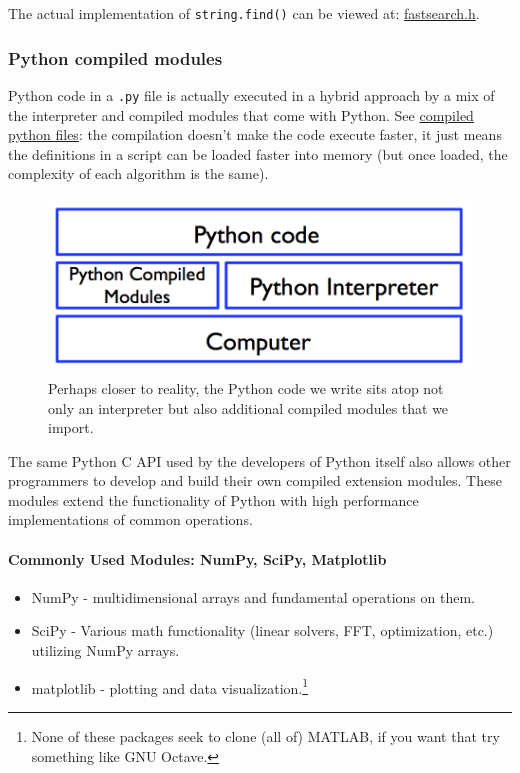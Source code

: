 \documentclass[12pt,letterpaper,twoside]{article}
\begin{document}
The actual implementation of \texttt{string.find()} can be viewed at:
\href{https://github.com/python/cpython/blob/master/Objects/stringlib/fastsearch.h}{fastsearch.h}.

\subsubsection{Python compiled modules}

Python code in a \texttt{.py} file is actually executed in a hybrid
approach by a mix of the interpreter and compiled modules that come
with Python. See
\href{https://docs.python.org/3/tutorial/modules.html#compiled-python-files}{compiled
  python files}: the compilation doesn't make the code execute faster,
it just means the definitions in a script can be loaded faster into
memory (but once loaded, the complexity of each algorithm is the same).

\begin{figure}[h]
\centering
\includegraphics[scale=0.45]{fig/python-compiled-modules.png}
\caption{Perhaps closer to reality, the Python code we write sits atop
not only an interpreter but also additional compiled modules that we
import.}
\end{figure}

The same Python C API used by the developers of Python itself also
allows other programmers to develop and build their own compiled
extension modules.
These modules extend the functionality of Python with high performance
implementations of common operations.

\paragraph{Commonly Used Modules: NumPy, SciPy, Matplotlib}

\begin{itemize}
\item
  NumPy - multidimensional arrays and fundamental operations on them.
\item
  SciPy - Various math functionality (linear solvers, FFT, optimization,
  etc.) utilizing NumPy arrays.
\item
  matplotlib - plotting and data visualization.\footnote{None of these packages seek to clone (all of) MATLAB, if you want that try
something like GNU Octave.}
\end{itemize}
\end{document}
